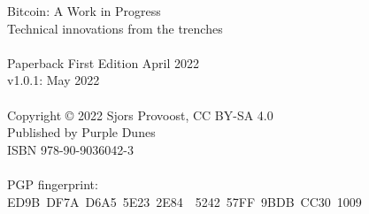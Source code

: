 \newpage
{\setlength{\parindent}{0cm}
\begin{vplace}
Bitcoin: A Work in Progress\\
Technical innovations from the trenches\\
\\
Paperback First Edition April 2022\\
v1.0.1: May 2022\\
\\
Copyright © 2022 Sjors Provoost, CC BY-SA 4.0\\
Published by Purple Dunes\\
ISBN 978-90-9036042-3\\


\\

PGP fingerprint:\\
ED9B DF7A D6A5 5E23 2E84  5242 57FF 9BDB CC30 1009\\

\end{vplace}
}
